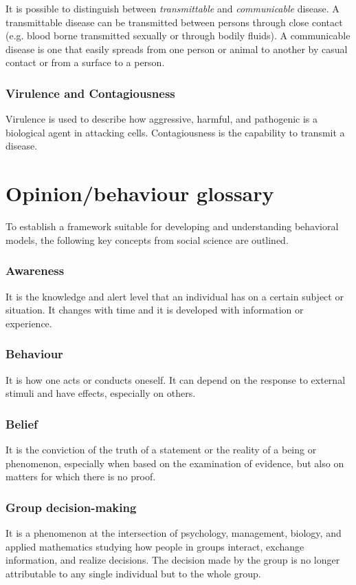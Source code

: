 It is possible to distinguish between \textit{transmittable} and \textit{communicable} disease. A transmittable disease can be transmitted between persons through close contact (e.g. blood borne transmitted sexually or through bodily fluids). A communicable disease is one that easily spreads from one person or animal to another by casual contact or from a surface to a person.  


\subsubsection{Virulence and Contagiousness}  Virulence is used to describe how aggressive, harmful, and pathogenic is a biological agent in attacking cells. Contagiousness is the capability to transmit a disease. 


\section{Opinion/behaviour glossary}
To establish a framework suitable for developing and understanding behavioral models, the following key concepts from social science are outlined.
\subsubsection{Awareness} It is the knowledge and alert level that an individual has on a certain subject or situation. It changes with time and it is developed with information or experience.  

\subsubsection{Behaviour} It is how one acts or conducts oneself. It can depend on the response to external stimuli and have effects, especially on others.


\subsubsection{Belief} It is the conviction of the truth of a statement or the reality of a being or phenomenon, especially when based on the examination of evidence, but also on matters for which there is no proof.


\subsubsection{Group decision-making} It is a phenomenon at the intersection of psychology, management, biology, and applied mathematics studying how people in groups interact, exchange information, and realize decisions. The decision made by the group is no longer attributable to any single individual but to the whole group. 

